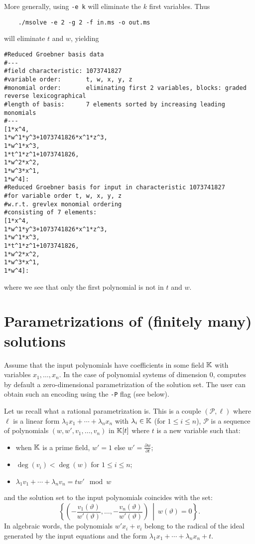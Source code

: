\documentclass[a4paper,english,11pt]{scrartcl}
\theoremstyle{definition}
\theoremstyle{remark}
\newcommand{\st}{\ \middle|\ }
\def\leq{\leqslant}
\begin{document}
More generally, using \verb+-e k+ will eliminate the $k$ first
variables. Thus
\begin{tcolorbox} %
  \begin{verbatim}
    ./msolve -e 2 -g 2 -f in.ms -o out.ms
  \end{verbatim}
\end{tcolorbox}
will eliminate $t$ and $w$, yielding
\begin{tcolorbox} %
  \begin{lstlisting}
#Reduced Groebner basis data
#---
#field characteristic: 1073741827
#variable order:       t, w, x, y, z
#monomial order:       eliminating first 2 variables, blocks: graded reverse lexicographical
#length of basis:      7 elements sorted by increasing leading monomials
#---
[1*x^4,
1*w^1*y^3+1073741826*x^1*z^3,
1*w^1*x^3,
1*t^1*z^1+1073741826,
1*w^2*x^2,
1*w^3*x^1,
1*w^4]:
#Reduced Groebner basis for input in characteristic 1073741827
#for variable order t, w, x, y, z
#w.r.t. grevlex monomial ordering
#consisting of 7 elements:
[1*x^4,
1*w^1*y^3+1073741826*x^1*z^3,
1*w^1*x^3,
1*t^1*z^1+1073741826,
1*w^2*x^2,
1*w^3*x^1,
1*w^4]:
  \end{lstlisting}
\end{tcolorbox}
where we see that only the first polynomial is not in $t$ and $w$.

\section{Parametrizations of (finitely many) solutions}
\label{sec:param}

Assume that the input polynomials have coefficients in some field $\mathbb{K}$ with
variables $x_1, \ldots, x_n$. In the case of polynomial systems of dimension
$0$, \msolve computes by default a zero-dimensional parametrization of the
solution set. The user can obtain such an encoding using the \verb+-P+ flag 
(see below).

Let us recall what a rational parametrization is.
This is a couple $(\mathscr{P}, \ell)$ where $\ell$ is a linear form $\lambda_1
x_1 + \cdots + \lambda_n x_n$ with $\lambda_i\in \mathbb{K}$ (for $1\leq i \leq n$),
$\mathscr{P}$ is a sequence of polynomials $(w, w', v_1, \ldots, v_n)$ in
$\mathbb{K}[t]$ where $t$ is a new variable such that:
\begin{itemize}
\item when $\mathbb{K}$ is a prime field, $w'=1$ else $w' = \frac{\partial w}{\partial
    t}$;
\item $\deg(v_i) < \deg(w)$ for $1\leq i \leq n$;
\item $\lambda_1 v_1 +\cdots +\lambda_n v_n = tw' \mod w$
\end{itemize}
and the solution set to the input polynomials coincides with the set:
\[
\left \{\left (-\frac{v_1(\vartheta)}{w'(\vartheta)}, \ldots,
  -\frac{v_n(\vartheta)}{w'(\vartheta)}\right ) \st w(\vartheta) = 0
\right\}.
\]
In algebraic words, the polynomials \(w' x_i + v_i\) belong to the radical of the 
ideal generated by the input equations and the form \(\lambda_1 x_1 + \cdots +
\lambda_n x_n + t\). 
\end{document}
